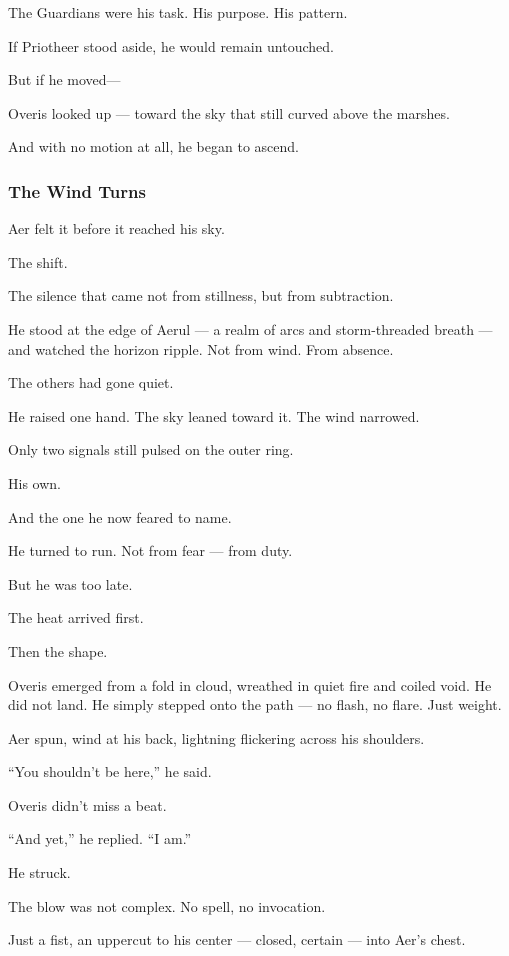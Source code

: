 \documentclass[12pt]{article}
\begin{document}
The Guardians were his task. His purpose. His pattern.

If Priotheer stood aside, he would remain untouched.

But if he moved—

Overis looked up — toward the sky that still curved above the marshes.

And with no motion at all, he began to ascend.

\dotfill

\subsubsection*{The Wind Turns}

Aer felt it before it reached his sky.

The shift.

The silence that came not from stillness, but from subtraction.

He stood at the edge of Aerul — a realm of arcs and storm-threaded breath — and watched the horizon ripple. Not from wind. From absence.

The others had gone quiet.

He raised one hand. The sky leaned toward it. The wind narrowed.

Only two signals still pulsed on the outer ring.

His own.

And the one he now feared to name.

He turned to run. Not from fear — from duty.

But he was too late.

The heat arrived first.

Then the shape.

Overis emerged from a fold in cloud, wreathed in quiet fire and coiled void. He did not land. He simply stepped onto the path — no flash, no flare. Just weight.

Aer spun, wind at his back, lightning flickering across his shoulders.

``You shouldn’t be here,'' he said.

Overis didn't miss a beat.

``And yet,'' he replied. ``I am.''

He struck.

The blow was not complex. No spell, no invocation.

Just a fist, an uppercut to his center — closed, certain — into Aer’s chest.
\end{document}
